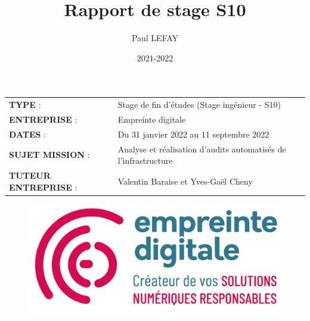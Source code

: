 \documentclass[12pt]{article}
\title{Rapport de stage S10}
\author{Paul LEFAY}
\date{2021-2022}
\begin{document}
\cfoot{\thepage}

\renewcommand{\headrulewidth}{0.4pt}
\renewcommand{\footrulewidth}{0.4pt}
\renewcommand{\contentsname}{Table des matières}
\renewcommand{\listfigurename}{}
\renewcommand{\listtablename}{}
\renewcommand{\thebibliography}{}
\renewcommand{\glossarysection}[2][]{}

\maketitle
\thispagestyle{empty}
\begin{center}
	\begin{tabular}{ m{5cm} m{11.5cm} }
	\textbf{TYPE} : & \mbox{\ooalign{$\checkmark$\cr\hidewidth$\square$\hidewidth\cr}}  Stage de fin d'études (Stage ingénieur - S10) \\
   \textbf{ENTREPRISE} :  & Empreinte digitale \\
   \textbf{DATES} : & Du 31 janvier 2022 au 11 septembre 2022 \\
   \textbf{SUJET MISSION} : & Analyse et réalisation d'audits automatisés de l'infrastructure \\
   \textbf{TUTEUR ENTREPRISE} :  & Valentin Baraise et Yves-Gaël Cheny \\
 \end{tabular}
\end{center}

\begin{figure}[!ht]
    \centering
    \includegraphics[scale=0.8]{src/ed_logo.png}
    \label{fig:ed_logo}
\end{figure}
\end{document}
